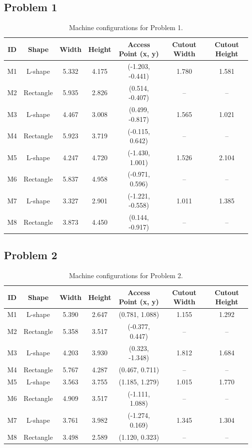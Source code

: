 \subsection{Problem 1}
\begin{table}[H]
\centering
\small
\begin{tabular}{ccccccc}
\toprule
\textbf{ID} & \textbf{Shape} & \textbf{Width} & \textbf{Height} & \textbf{Access Point (x, y)} & \textbf{Cutout Width} & \textbf{Cutout Height} \\
\midrule
M1 & L-shape   & 5.332 & 4.175 & (-1.203, -0.441) & 1.780 & 1.581 \\
M2 & Rectangle & 5.935 & 2.826 & (0.514, -0.407)  & --    & --    \\
M3 & L-shape   & 4.467 & 3.008 & (0.499, -0.817)  & 1.565 & 1.021 \\
M4 & Rectangle & 5.923 & 3.719 & (-0.115, 0.642)  & --    & --    \\
M5 & L-shape   & 4.247 & 4.720 & (-1.430, 1.001)  & 1.526 & 2.104 \\
M6 & Rectangle & 5.837 & 4.958 & (-0.971, 0.596)  & --    & --    \\
M7 & L-shape   & 3.327 & 2.901 & (-1.221, -0.558) & 1.011 & 1.385 \\
M8 & Rectangle & 3.873 & 4.450 & (0.144, -0.917)  & --    & --    \\
\bottomrule
\end{tabular}
\caption{Machine configurations for Problem 1.}
\end{table}

\subsection{Problem 2}
\begin{table}[H]
\centering
\small
\begin{tabular}{ccccccc}
\toprule
\textbf{ID} & \textbf{Shape} & \textbf{Width} & \textbf{Height} & \textbf{Access Point (x, y)} & \textbf{Cutout Width} & \textbf{Cutout Height} \\
\midrule
M1 & L-shape   & 5.390 & 2.647 & (0.781, 1.088)   & 1.155 & 1.292 \\
M2 & Rectangle & 5.358 & 3.517 & (-0.377, 0.447)  & --    & --    \\
M3 & L-shape   & 4.203 & 3.930 & (0.323, -1.348)  & 1.812 & 1.684 \\
M4 & Rectangle & 5.767 & 4.287 & (0.467, 0.711)   & --    & --    \\
M5 & L-shape   & 3.563 & 3.755 & (1.185, 1.279)   & 1.015 & 1.770 \\
M6 & Rectangle & 4.909 & 3.517 & (-1.111, 1.088)  & --    & --    \\
M7 & L-shape   & 3.761 & 3.982 & (-1.274, 0.169)  & 1.345 & 1.304 \\
M8 & Rectangle & 3.498 & 2.589 & (1.120, 0.323)   & --    & --    \\
\bottomrule
\end{tabular}
\caption{Machine configurations for Problem 2.}
\end{table}

